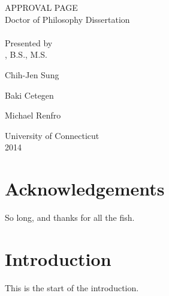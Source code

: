 \documentclass[12pt]{report}
\newcommand{\blankline}{\vspace*{\baselineskip}}
\begin{document}
\setcounter{page}{1}
\begin{center}
APPROVAL PAGE \\
Doctor of Philosophy Dissertation \\
\thetitle \\
\blankline \blankline
Presented by \\
\theauthor, B.S., M.S. \\
\end{center}
\blankline
{}
\vspace{-0.5\baselineskip}
\begin{center}
Chih-Jen Sung
\end{center}
\blankline
{}
\vspace{-0.5\baselineskip}
\begin{center}
Baki Cetegen
\end{center}
\blankline
{}
\vspace{-0.5\baselineskip}
\begin{center}
Michael Renfro
\end{center}
\blankline \blankline \blankline \blankline \blankline
\begin{center}
University of Connecticut \\
2014
\end{center}
\newpage

\chapter{Acknowledgements}
So long, and thanks for all the fish.
\newpage

\tableofcontents
\newpage

\setcounter{page}{1}
\chapter{Introduction}
This is the start of the introduction.
\end{document}
